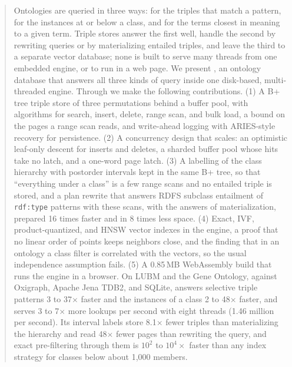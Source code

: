 \begin{abstract}
Ontologies are queried in three ways: for the triples that match a pattern,
for the instances at or below a class, and for the terms closest in meaning
to a given term.
Triple stores answer the first well, handle the second by rewriting queries
or by materializing entailed triples, and leave the third to a separate
vector database; none is built to serve many threads from one embedded
engine, or to run in a web page.
We present \sys, an ontology database that answers all three kinds of query
inside one disk-based, multi-threaded engine.
Through \sys we make the following contributions.
(1) A B+ tree triple store of three permutations behind a buffer pool, with
algorithms for search, insert, delete, range scan, and bulk load, a bound on
the pages a range scan reads, and write-ahead logging with ARIES-style
recovery for persistence.
(2) A concurrency design that scales: an optimistic leaf-only descent for
inserts and deletes, a sharded buffer pool whose hits take no latch, and a
one-word page latch.
(3) A labelling of the class hierarchy with postorder intervals kept in the
same B+ tree, so that ``everything under a class'' is a few range scans and no
entailed triple is stored, and a plan rewrite that answers RDFS subclass
entailment of \texttt{rdf:type} patterns with these scans, with the answers of
materialization, prepared 16 times faster and in 8 times less space.
(4) Exact, IVF, product-quantized, and HNSW vector indexes in the engine, a
proof that no linear order of points keeps neighbors close, and the finding
that in an ontology a class filter is correlated with the vectors, so the
usual independence assumption fails.
(5) A 0.85\,MB WebAssembly build that runs the engine in a browser.
On LUBM and the Gene Ontology, against Oxigraph, Apache Jena TDB2, and SQLite,
\sys answers selective triple patterns 3 to 37$\times$ faster and the
instances of a class 2 to 48$\times$ faster, and serves 3 to 7$\times$ more
lookups per second with eight threads (1.46 million per second).
Its interval labels store 8.1$\times$ fewer triples than materializing the
hierarchy and read 48$\times$ fewer pages than rewriting the query, and exact
pre-filtering through them is $10^2$ to $10^4\times$ faster than any index
strategy for classes below about 1,000 members.
\end{abstract}
